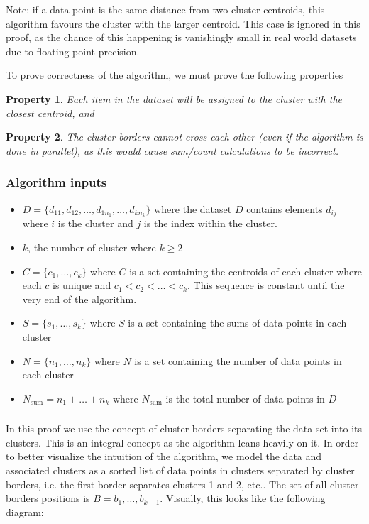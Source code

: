 \documentclass[conference,compsoc]{IEEEtran}
\newtheorem{prp}{Property}
\begin{document}
Note: if a data point is the same distance from two cluster centroids, this algorithm favours the cluster with the larger centroid.
This case is ignored in this proof, as the chance of this happening is vanishingly small in real world datasets due to floating point precision.

To prove correctness of the algorithm, we must prove the following properties
\begin{prp}\label{closest-centroid}Each item in the dataset will be assigned to the cluster with the closest centroid, and\end{prp}
\begin{prp}\label{border-cross}The cluster borders cannot cross each other (even if the algorithm is done in parallel), as this would cause sum/count calculations to be incorrect.\end{prp}

\subsubsection{Algorithm inputs}
\begin{itemize}
\item $D = \{d_{11}, d_{12}, \dots , d_{1n_1}, \dots, d_{kn_k}\}$ where the dataset $D$ contains elements $d_{ij}$ where $i$ is the cluster and $j$ is the index within the cluster. 
\item $k$, the number of cluster where $k \geq 2$
\item $C = \{c_1, \dots, c_k\}$ where $C$ is a set containing the centroids of each cluster where each $c$ is unique and $c_1 < c_2 < \dots < c_k$. This sequence is constant until the very end of the algorithm.
\item $S = \{s_1, \dots, s_k\}$ where $S$ is a set containing the sums of data points in each cluster
\item $N = \{n_1, \dots, n_k\}$ where $N$ is a set containing the number of data points in each cluster
\item $N_{\text{sum}} = {n_1 + \dots + n_k}$ where $N_{\text{sum}}$ is the total number of data points in $D$
\end{itemize}

\subsubsection{}
In this proof we use the concept of cluster borders separating the data set into its clusters.
This is an integral concept as the algorithm leans heavily on it.
In order to better visualize the intuition of the algorithm, we model the data and associated clusters as a sorted list of data points in clusters separated by cluster borders, i.e. the first border separates clusters 1 and 2, etc.. The set of all cluster borders positions is $B = b_1, \dots, b_{k-1}$. Visually, this looks like the following diagram:
\end{document}
